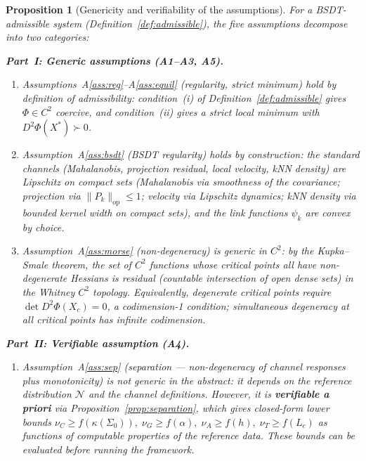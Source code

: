 \documentclass[11pt,a4paper]{article}
\newtheorem{proposition}[theorem]{Proposition}
\begin{document}
\begin{proposition}[Genericity and verifiability of the assumptions]\label{prop:generic}
For a BSDT-admissible system (Definition~\ref{def:admissible}),
the five assumptions decompose into two categories:

\medskip
\noindent\textbf{Part~I: Generic assumptions (A1--A3, A5).}
\begin{enumerate}[nosep]
  \item[\textup{(i)}] Assumptions~A\ref{ass:reg}--A\ref{ass:equil}
    (regularity, strict minimum) hold \emph{by definition} of
    admissibility: condition~(i) of Definition~\ref{def:admissible}
    gives $\Phi \in C^2$ coercive, and condition~(ii) gives a strict
    local minimum with $D^2\Phi(X^*) \succ 0$.
  \item[\textup{(ii)}] Assumption~A\ref{ass:bsdt} (BSDT regularity)
    holds \emph{by construction}: the standard channels
    (Mahalanobis, projection residual, local velocity, kNN density)
    are Lipschitz on compact sets (Mahalanobis via smoothness of
    the covariance; projection via $\|P_k\|_{\mathrm{op}} \le 1$;
    velocity via Lipschitz dynamics; kNN density via bounded
    kernel width on compact sets), and the link functions $\psi_k$
    are convex by choice.
  \item[\textup{(iii)}] Assumption~A\ref{ass:morse} (non-degeneracy)
    is \emph{generic in $C^2$}: by the Kupka--Smale theorem,
    the set of $C^2$ functions whose critical points all have
    non-degenerate Hessians is residual (countable intersection of
    open dense sets) in the Whitney $C^2$ topology.  Equivalently,
    degenerate critical points require $\det D^2\Phi(X_c) = 0$,
    a codimension-1 condition; simultaneous degeneracy at all
    critical points has infinite codimension.
\end{enumerate}

\noindent\textbf{Part~II: Verifiable assumption (A4).}
\begin{enumerate}[nosep]
  \item[\textup{(iv)}] Assumption~A\ref{ass:sep} (separation ---
    non-degeneracy of channel responses plus monotonicity) is
    \emph{not generic in the abstract}: it depends on the
    reference distribution $\mathcal{N}$ and the channel
    definitions.  However, it is \textbf{verifiable a priori}
    via Proposition~\ref{prop:separation}, which gives
    closed-form lower bounds
    $\nu_C \ge f(\kappa(\Sigma_0)),\;
     \nu_G \ge f(\alpha),\;
     \nu_A \ge f(h),\;
     \nu_T \ge f(L_c)$
    as functions of computable properties of the reference data.
    These bounds can be evaluated \emph{before running the framework}.


\end{enumerate}
\end{proposition}
\end{document}
